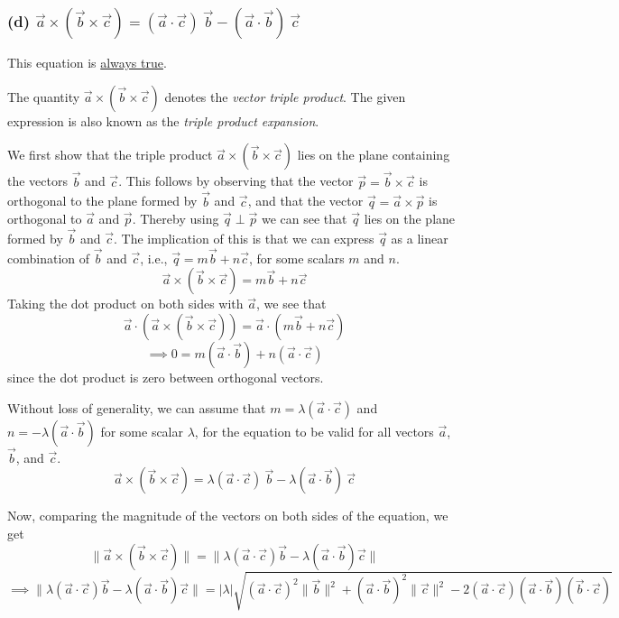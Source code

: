 \newpage
\subsubsection*{(d) \( \vec{a} \times (\vec{b} \times \vec{c}) = (\vec{a} \cdot \vec{c})\ \vec{b} - (\vec{a} \cdot \vec{b})\ \vec{c} \)}

This equation is \underline{always true}.

The quantity \( \vec{a} \times (\vec{b} \times \vec{c}) \) denotes the \textit{vector triple product}.
The given expression is also known as the \textit{triple product expansion}.

We first show that the triple product \( \vec{a} \times (\vec{b} \times \vec{c}) \) lies on the plane containing the vectors \( \vec{b} \) and  \( \vec{c} \).
This follows by observing that the vector \( \vec{p} = \vec{b} \times \vec{c}\) is orthogonal to the plane formed by \( \vec{b} \) and  \( \vec{c} \), and that the vector \( \vec{q} = \vec{a} \times \vec{p} \) is orthogonal to \( \vec{a} \) and \( \vec{p} \).
Thereby using \( \vec{q} \perp \vec{p} \) we can see that \( \vec{q} \) lies on the plane formed by \( \vec{b} \) and  \( \vec{c} \).
The implication of this is that we can express \( \vec{q} \) as a linear combination of \( \vec{b} \) and  \( \vec{c} \), i.e., \( \vec{q} = m\vec{b} + n\vec{c} \), for some scalars \( m \) and \( n \).
\begin{equation*}
    \vec{a} \times (\vec{b} \times \vec{c}) = m\vec{b} + n\vec{c}
\end{equation*}
Taking the dot product on both sides with \( \vec{a} \), we see that
\[
    \vec{a} \cdot (\vec{a} \times (\vec{b} \times \vec{c})) = \vec{a} \cdot (m\vec{b} + n\vec{c})
\]
\[
    \implies 0 = m(\vec{a} \cdot \vec{b}) + n(\vec{a} \cdot \vec{c})
\]
since the dot product is zero between orthogonal vectors.

Without loss of generality, we can assume that \( m = \lambda(\vec{a} \cdot \vec{c}) \) and \( n = -\lambda(\vec{a} \cdot \vec{b}) \) for some scalar \( \lambda \), for the equation to be valid for all vectors \( \vec{a} \), \( \vec{b} \), and \( \vec{c} \).
\begin{equation}
    \vec{a} \times (\vec{b} \times \vec{c}) = \lambda (\vec{a} \cdot \vec{c})\ \vec{b} - \lambda (\vec{a} \cdot \vec{b})\ \vec{c}
    \tag{6.d.1}
    \label{eq:6.d.1}
\end{equation}

Now, comparing the magnitude of the vectors on both sides of the equation, we get
\[
    \lVert \vec{a} \times (\vec{b} \times \vec{c}) \rVert
    = \lVert \lambda (\vec{a} \cdot \vec{c}) \vec{b} - \lambda (\vec{a} \cdot \vec{b}) \vec{c} \rVert
\]
\[
    \implies
    \lVert \lambda (\vec{a} \cdot \vec{c}) \vec{b} - \lambda (\vec{a} \cdot \vec{b}) \vec{c} \rVert
    = \lvert \lambda \rvert \sqrt{ {(\vec{a} \cdot \vec{c})}^2 \lVert \vec{b} \rVert ^2 + {(\vec{a} \cdot \vec{b})}^2 \lVert \vec{c} \rVert ^2 - 2 (\vec{a} \cdot \vec{c})(\vec{a} \cdot \vec{b})(\vec{b} \cdot \vec{c}) }
\]

